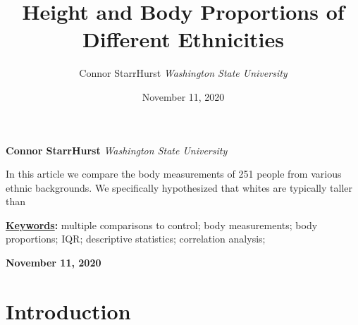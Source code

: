 \documentclass[]{article}
\title{\textbf{\textcolor{WSU.crimson}{Height and Body Proportions of Different Ethnicities}}  }
\author{\Large Connor StarrHurst\vspace{0.05in} \newline\normalsize\emph{Washington State University}  }
\date{November 11, 2020}
\newcommand*{\authorfont}{\fontfamily{phv}\selectfont}
\renewenvironment{abstract}
 {{%
    \setlength{\leftmargin}{0mm}
    \setlength{\rightmargin}{\leftmargin}%
  }%
  \relax}
 {\endlist}
\begin{document}
	
%

{%
\setlength{\parindent}{0pt}
\thispagestyle{plain}
{\fontsize{18}{20}\selectfont\raggedright 
\maketitle  %

}

{
   \vskip 13.5pt\relax \normalsize\fontsize{11}{12} 
   
\textbf{\authorfont Connor StarrHurst} \hskip 15pt \emph{\small Washington State University}   

}

}








\begin{abstract}

    \hbox{\vrule height .2pt width 39.14pc}

    \vskip 8.5pt %

\noindent In this article we compare the body measurements of 251 people from
various ethnic backgrounds. We specifically hypothesized that whites are
typically taller than \vspace{0.25in}


\vskip 8.5pt \noindent \textbf{\underline{Keywords}:} multiple comparisons to control; body measurements; body proportions;
IQR; descriptive statistics; correlation analysis; \par

    




    
    \hbox{\vrule height .2pt width 39.14pc}
    \vskip 5pt 
    \hfill \textbf{\textcolor{WSU.gray}{ November 11, 2020 } }
    \vskip 5pt 
    
\end{abstract}


\vskip -8.5pt




\noindent  

\section{Introduction}
\label{sec:intro}
\end{document}
